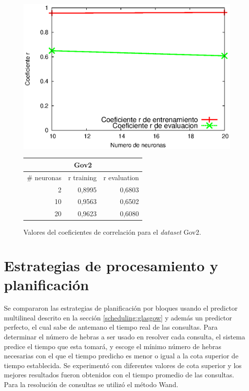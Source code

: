 \begin{figure}[tp]
  \begin{minipage}[][][b]{0.5\linewidth}
    \centering
    \includegraphics[width=\linewidth]{images/gov2RN.eps}
  \end{minipage}%
\begin{tabular}{|r|r|r|}
\hline
\multicolumn{ 3}{|c|}{Gov2} \\ \hline
\multicolumn{1}{|l|}{\# neuronas} & \multicolumn{1}{l|}{r training} & \multicolumn{1}{l|}{r evaluation} \\ \hline
2 & 0,8995 & 0,6803 \\ \hline
10 & 0,9563 & 0,6502 \\ \hline
20 & 0,9623 & 0,6080 \\ \hline
\end{tabular}

\caption{Valores del coeficientes de correlación para el \textit{dataset} Gov2.}
\label{fig:gov2RN}
\end{figure}


\section{Estrategias de procesamiento y planificación}
\label{evaluacionexperimental:estrategiasscheduling}
Se compararon las estrategias de planificación por bloques \citep{Ye:2007} usando el predictor multilineal descrito en la sección \ref{scheduling:glasgow} y además un predictor perfecto, el cual sabe de antemano el tiempo real de las consultas. Para determinar el número de hebras a ser usado en resolver cada consulta, el sistema predice el tiempo que esta tomará, y escoge el mínimo número de hebras necesarias con el que el tiempo predicho es menor o igual a la cota superior de tiempo establecida. Se experimentó con diferentes valores de cota superior y los mejores resultados fueron obtenidos con el tiempo promedio de las consultas. Para la resolución de consultas se utilizó el método Wand.

